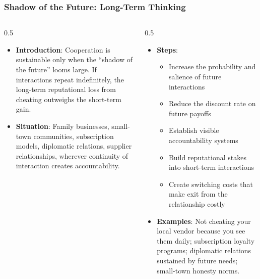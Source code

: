 \begin{frame}[fragile]\frametitle{Shadow of the Future: Long-Term Thinking}
\begin{columns}
    \begin{column}[T]{0.5\linewidth}
      \begin{itemize}
        \item \textbf{Introduction}: Cooperation is sustainable only when the ``shadow of the future'' looms large. If interactions repeat indefinitely, the long-term reputational loss from cheating outweighs the short-term gain.
        \item \textbf{Situation}: Family businesses, small-town communities, subscription models, diplomatic relations, supplier relationships, wherever continuity of interaction creates accountability.
      \end{itemize}
    \end{column}
    \begin{column}[T]{0.5\linewidth}
      \begin{itemize}
        \item \textbf{Steps}:
        \begin{itemize}
          \item Increase the probability and salience of future interactions
          \item Reduce the discount rate on future payoffs
          \item Establish visible accountability systems
          \item Build reputational stakes into short-term interactions
          \item Create switching costs that make exit from the relationship costly
        \end{itemize}\item \textbf{Examples}: Not cheating your local vendor because you see them daily; subscription loyalty programs; diplomatic relations sustained by future needs; small-town honesty norms.
      \end{itemize}
    \end{column}
  \end{columns}
\end{frame}


